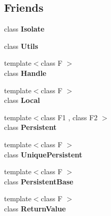 \subsection*{Friends}
\begin{DoxyCompactItemize}
\item 
\hypertarget{classv8_1_1PersistentBase_aba4f0964bdacf2bbf62cf876e5d28d0a}{}class {\bfseries Isolate}\label{classv8_1_1PersistentBase_aba4f0964bdacf2bbf62cf876e5d28d0a}

\item 
\hypertarget{classv8_1_1PersistentBase_abc0f7da619e9e72510dc07ed7b5ff6d8}{}class {\bfseries Utils}\label{classv8_1_1PersistentBase_abc0f7da619e9e72510dc07ed7b5ff6d8}

\item 
\hypertarget{classv8_1_1PersistentBase_a67ca1a2d91273eaf85fb3d23ba8ce984}{}{\footnotesize template$<$class F $>$ }\\class {\bfseries Handle}\label{classv8_1_1PersistentBase_a67ca1a2d91273eaf85fb3d23ba8ce984}

\item 
\hypertarget{classv8_1_1PersistentBase_afb872edb4aac7ba55f0da004113aa2b0}{}{\footnotesize template$<$class F $>$ }\\class {\bfseries Local}\label{classv8_1_1PersistentBase_afb872edb4aac7ba55f0da004113aa2b0}

\item 
\hypertarget{classv8_1_1PersistentBase_ad845ec8872174be0a9ca9a3dd1898d30}{}{\footnotesize template$<$class F1 , class F2 $>$ }\\class {\bfseries Persistent}\label{classv8_1_1PersistentBase_ad845ec8872174be0a9ca9a3dd1898d30}

\item 
\hypertarget{classv8_1_1PersistentBase_aa15762bfc503091516cc63d53c9dbe12}{}{\footnotesize template$<$class F $>$ }\\class {\bfseries Unique\+Persistent}\label{classv8_1_1PersistentBase_aa15762bfc503091516cc63d53c9dbe12}

\item 
\hypertarget{classv8_1_1PersistentBase_abb172e0bb22fc5fed7a3a66f29d046ce}{}{\footnotesize template$<$class F $>$ }\\class {\bfseries Persistent\+Base}\label{classv8_1_1PersistentBase_abb172e0bb22fc5fed7a3a66f29d046ce}

\item 
\hypertarget{classv8_1_1PersistentBase_a53f604d3d6f2dc0647df33c9979f116a}{}{\footnotesize template$<$class F $>$ }\\class {\bfseries Return\+Value}\label{classv8_1_1PersistentBase_a53f604d3d6f2dc0647df33c9979f116a}


\end{DoxyCompactItemize}
